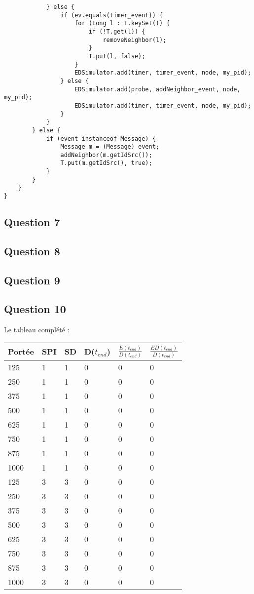 \documentclass[10pt]{report}
\begin{document}
\begin{minipage}{\textwidth}
\begin{shaded}
\begin{lstlisting}
			} else {
				if (ev.equals(timer_event)) {
					for (Long l : T.keySet()) {
						if (!T.get(l)) {
							removeNeighbor(l);
						}
						T.put(l, false);
					}
					EDSimulator.add(timer, timer_event, node, my_pid);
				} else {
					EDSimulator.add(probe, addNeighbor_event, node, my_pid);
					EDSimulator.add(timer, timer_event, node, my_pid);
				}
			}
		} else {
			if (event instanceof Message) {
				Message m = (Message) event;
				addNeighbor(m.getIdSrc());
				T.put(m.getIdSrc(), true);
			}
		}
	}
}

\end{lstlisting}
\end{shaded}
\end{minipage}

\subsection{Question 7}
\subsection{Question 8}
\subsection{Question 9}
\subsection{Question 10}
Le tableau complété :\\

\begin{center}
\begin{tabular}{|l|l|l|l|l|l|}
  \hline
  Portée & SPI & SD & D($t_{end}$) & $\frac{E(t_{end})}{D(t_{end})}$ & $\frac{ED(t_{end})}{D(t_{end})}$\\
  \hline
	125 & 1 & 1 & 0 & 0 & 0\\
  \hline
	250 & 1 & 1 & 0 & 0 & 0\\
  \hline
	375 & 1 & 1 & 0 & 0 & 0\\
  \hline
	500 & 1 & 1 & 0 & 0 & 0\\
  \hline
	625 & 1 & 1 & 0 & 0 & 0\\
  \hline
	750 & 1 & 1 & 0 & 0 & 0\\
  \hline
	875 & 1 & 1 & 0 & 0 & 0\\
  \hline
	1000 & 1 & 1 & 0 & 0 & 0\\
  \hline
	125 & 3 & 3 & 0 & 0 & 0\\
  \hline
	250 & 3 & 3 & 0 & 0 & 0\\
  \hline
	375 & 3 & 3 & 0 & 0 & 0\\
  \hline
	500 & 3 & 3 & 0 & 0 & 0\\
  \hline
	625 & 3 & 3 & 0 & 0 & 0\\
  \hline
	750 & 3 & 3 & 0 & 0 & 0\\
  \hline
	875 & 3 & 3 & 0 & 0 & 0\\
  \hline
	1000 & 3 & 3 & 0 & 0 & 0\\
  \hline
\end{tabular}
\end{center}
\end{document}
